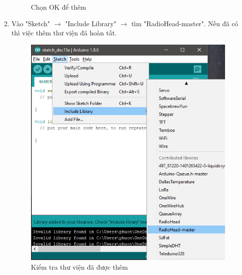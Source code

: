 \begin{enumerate}
\begin{center}
\begin{figure}[htp]
\begin{center}
\end{center}
\caption{Chọn OK để thêm}
\end{figure}
\end{center}
\newpage
\item Vào "Sketch" $\rightarrow$ "Include Library" $\rightarrow$ tìm "RadioHead-master". Nếu đã có thì việc thêm thư viện đã hoàn tất.
\begin{center}
\begin{figure}[htp]
\begin{center}
\includegraphics[scale=0.7]{image4/arduino12.png}
\end{center}
\caption{Kiểm tra thư viện đã được thêm}
\end{figure}
\end{center}
\end{enumerate}
\newpage
